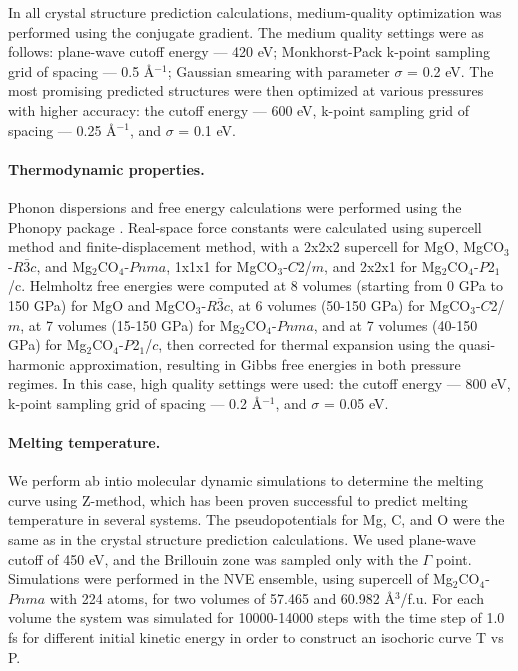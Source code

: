 \documentclass[a4paperm]{article}
\begin{document}
In all crystal structure prediction calculations, medium-quality optimization was performed using the conjugate gradient.
The medium quality settings were as follows: plane-wave cutoff energy --- 420 eV; Monkhorst-Pack k-point sampling grid of spacing --- 0.5 \AA$^{-1}$; Gaussian smearing with parameter $\sigma$ = 0.2 eV.
The most promising predicted structures were then optimized at various pressures with higher accuracy: the cutoff energy --- 600 eV, k-point sampling grid of spacing --- 0.25 \AA$^{-1}$, and $\sigma$ = 0.1 eV.

\paragraph{Thermodynamic properties.}
Phonon dispersions and free energy calculations were performed using the Phonopy package \cite{phonopy}.
Real-space force constants were calculated using supercell method and finite-displacement method, with a 2x2x2 supercell for MgO, MgCO$_3$-$R\bar{3}c$, and Mg$_2$CO$_4$-$Pnma$, 1x1x1 for MgCO$_3$-$C$2/$m$, and 2x2x1 for Mg$_2$CO$_4$-$P$2$_1$/c.
Helmholtz free energies were computed at 8 volumes (starting from 0 GPa to 150 GPa) for MgO and MgCO$_3$-$R\bar{3}c$, at 6 volumes (50-150 GPa) for MgCO$_3$-$C$2/$m$, at 7 volumes (15-150 GPa) for Mg$_2$CO$_4$-$Pnma$, and at 7 volumes (40-150 GPa) for Mg$_2$CO$_4$-$P$2$_1$/$c$, then corrected for thermal expansion using the quasi-harmonic approximation, resulting in Gibbs free energies in both pressure regimes.
In this case, high quality settings were used: the cutoff energy --- 800 eV, k-point sampling grid of spacing --- 0.2 \AA$^{-1}$, and $\sigma$ = 0.05 eV.

\paragraph{Melting temperature.}
We perform ab intio molecular dynamic simulations to determine the melting curve using Z-method, which has been proven successful to predict melting temperature in several systems.
The pseudopotentials for Mg, C, and O were the same as in the crystal structure prediction calculations.
We used plane-wave cutoff of 450 eV, and the Brillouin zone was sampled only with the $\Gamma$ point. Simulations were performed in the NVE ensemble, using supercell of Mg$_2$CO$_4$-$Pnma$ with 224 atoms, for two volumes of 57.465 and 60.982 \AA{$^3$}/f.u.
For each volume the system was simulated for 10000-14000 steps with the time step of 1.0 fs for different initial kinetic energy in order to construct an isochoric curve T vs P.
\end{document}
